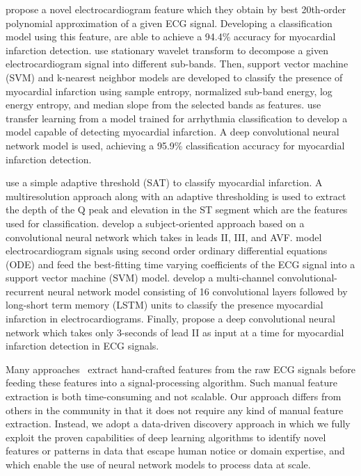 \documentclass{svproc}
\begin{document}
\cite{liu1} propose a novel electrocardiogram feature which they obtain by best 20th-order polynomial approximation of a given ECG signal. Developing a classification model using this feature, \cite{liu1} are able to achieve a 94.4\% accuracy for myocardial infarction detection. \cite{sharma} use stationary wavelet transform to decompose a given electrocardiogram signal into different sub-bands. Then, support vector machine (SVM) and k-nearest neighbor models are developed to classify the presence of myocardial infarction using sample entropy, normalized sub-band energy, log energy entropy, and median slope from the selected bands as features. \cite{kachuee} use transfer learning from a model trained for arrhythmia classification to develop a model capable of detecting myocardial infarction. A deep convolutional neural network model is used, achieving a 95.9\% classification accuracy for myocardial infarction detection. 

\cite{remya} use a simple adaptive threshold (SAT) to classify myocardial infarction. A multiresolution approach along with an adaptive thresholding is used to extract the depth of the Q peak and elevation in the ST segment which are the features used for classification. \cite{reasat} develop a subject-oriented approach based on a convolutional neural network which takes in leads II, III, and AVF. \cite{zewdie} model electrocardiogram signals using second order ordinary differential equations (ODE) and feed the best-fitting time varying coefficients of the ECG signal into a support vector machine (SVM) model. \cite{feng} develop a multi-channel convolutional-recurrent neural network model consisting of 16 convolutional layers followed by long-short term memory (LSTM) units to classify the presence myocardial infarction in electrocardiograms. Finally, \cite{liu2} propose a deep convolutional neural network which takes only 3-seconds of lead II as input at a time for myocardial infarction detection in ECG signals. 
 
Many approaches~\cite{safdarian, kojuri, sun, liu1, sharma, kachuee, remya, reasat, zewdie, feng} extract hand-crafted features from the raw ECG signals before feeding these features into a signal-processing algorithm. Such manual feature extraction is both time-consuming and not scalable. Our approach differs from others in the community in that it does not require any kind of manual feature extraction. Instead, we adopt a data-driven discovery approach in which we fully exploit the proven capabilities of deep learning algorithms to identify novel features or patterns in data that escape human notice or domain expertise, and which enable the use of neural network models to process data at scale. 
\end{document}
